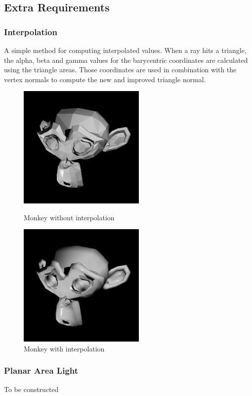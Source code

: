 \documentclass{article}
\begin{document}
    \subsection{Extra Requirements}
    \subsubsection{Interpolation}
    A simple method for computing interpolated values. When a ray hits a triangle, the alpha, beta and gamma 
    values for the barycentric coordinates are calculated using the triangle areas. Those coordinates are 
    used in combination with the vertex normals to compute the new and improved triangle normal.

    \begin{figure}[!htb]
        \includegraphics[width=\linewidth, height=6cm]{images/monke_no_bary}
        \caption*{Monkey without interpolation}
      \endminipage\hfill
        \includegraphics[width=\linewidth, height=6cm]{images/monke_bary}
        \caption*{Monkey with interpolation}
      \endminipage
  \end{figure}

    \subsubsection{Planar Area Light}
    To be constructed
\end{document}
